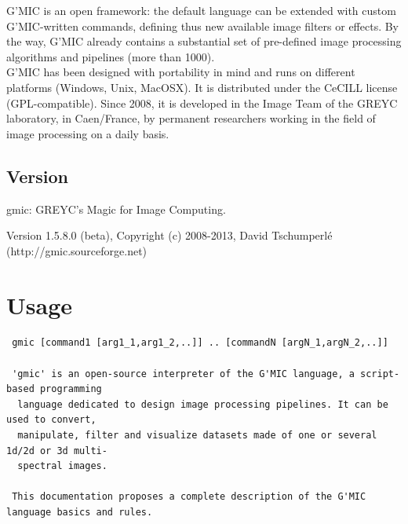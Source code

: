 \documentclass[a4paper,11pt,twoside]{book}
\begin{document}
G'MIC is an open framework: the default language can be extended with custom G'MIC-written commands, defining thus new available image filters or effects. By the way, G'MIC already contains a substantial set of pre-defined image processing algorithms and pipelines (more than 1000).\\ 
 
G'MIC has been designed with portability in mind and runs on different platforms (Windows, Unix, MacOSX). It is distributed under the CeCILL license (GPL-compatible). Since 2008, it is developed in the Image Team of the GREYC laboratory, in Caen/France, by permanent researchers working in the field of image processing on a daily basis. 
\section*{Version} 
 
 gmic: GREYC's Magic for Image Computing. 
 
        Version 1.5.8.0 (beta), Copyright (c) 2008-2013, David Tschumperl\'e 
        (http://gmic.sourceforge.net) 
\chapter{Usage} 
\small
\begin{lstlisting}
 gmic [command1 [arg1_1,arg1_2,..]] .. [commandN [argN_1,argN_2,..]] 
 
 'gmic' is an open-source interpreter of the G'MIC language, a script-based programming 
  language dedicated to design image processing pipelines. It can be used to convert, 
  manipulate, filter and visualize datasets made of one or several 1d/2d or 3d multi- 
  spectral images. 
 
 This documentation proposes a complete description of the G'MIC language basics and rules.
\end{lstlisting}
\normalsize
\end{document}
